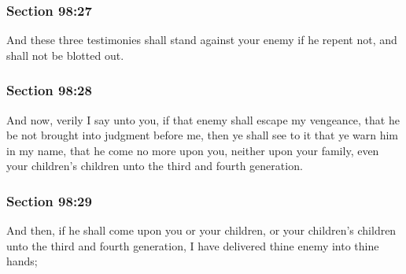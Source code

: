 	\subsubsection{Section 98:27} %
		\label{DC98-27}

		And these three testimonies shall stand against your enemy if he repent not, and shall not be blotted out.


	\subsubsection{Section 98:28} %
		\label{DC98-28}

		And now, verily I say unto you, if that enemy shall escape my vengeance, that he be not brought into judgment before me, then ye shall see to it that ye warn him in my name, that he come no more upon you, neither upon your family, even your children's children unto the third and fourth generation.


	\subsubsection{Section 98:29} %
		\label{DC98-29}

		And then, if he shall come upon you or your children, or your children's children unto the third and fourth generation, I have delivered thine enemy into thine hands;


